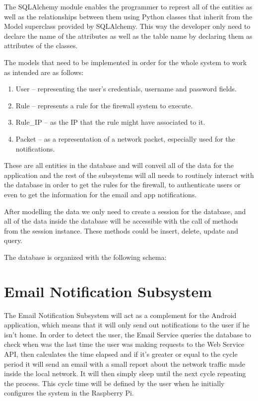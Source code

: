 The SQLAlchemy module enables the programmer to represt all of the entities as
well as the relationships between them using Python classes that inherit from
the Model superclass provided by SQLAlchemy. This way the developer only need to
declare the name of the attributes as well as the table name by declaring them
as attributes of the classes.

The models that need to be implemented in order for the whole system to work as
intended are as follows:
\begin{enumerate}
	\item User -- representing the user's credentials, username and password
		fields.
	\item Rule -- represents a rule for the firewall system to execute.
	\item Rule\_IP -- as the IP that the rule might have associated to it.
	\item Packet -- as a representation of a network packet, especially used for
		the notifications.
\end{enumerate}

These are all entities in the database and will conveil all of the data for the
application and the rest of the subsystems will all needs to routinely interact
with the database in order to get the rules for the firewall, to authenticate
users or even to get the information for the email and app notifications.


After modelling the data we only need to create a session for the database, and
all of the data inside the database will be accessible with the call of methods
from the session instance. These methods could be insert, delete, update and
query.



The database is organized with the following schema:



\section{Email Notification Subsystem}
\label{chap4:sec:email-sys}
The Email Notification Subsystem will act as a complement for the Android
application, which means that it will only send out notifications to the user if
he isn't home. In order to detect the user, the Email Service queries the
database to check when was the last time the user was making requests to the Web
Service API, then calculates the time elapsed and if it's greater or equal to
the cycle period it will send an email with a small report about the network
traffic made inside the local network. It will then simply sleep until the next
cycle repeating the process. This cycle time will be defined by the user when he
initially configures the system in the Raspberry Pi.

